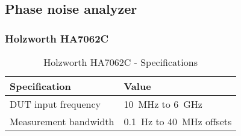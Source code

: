 \subsection{Phase noise analyzer}
\subsubsection{Holzworth HA7062C}\label{app:holzworth-ha7062c}
\begin{table}[H]
	\centering
	\caption{Holzworth HA7062C - Specifications}
	\label{tab:holzworth-ha7062c-specs}
	\begin{tabularx}{\textwidth}{ll}
		\toprule
		\textbf{Specification} & \textbf{Value}\\
		\midrule
		DUT input frequency & \SI{10}{\MHz} to \SI{6}{\GHz}\\
		Measurement bandwidth & \SI{0.1}{\Hz} to \SI{40}{\MHz} offsets\\
	\end{tabularx}
\end{table}



